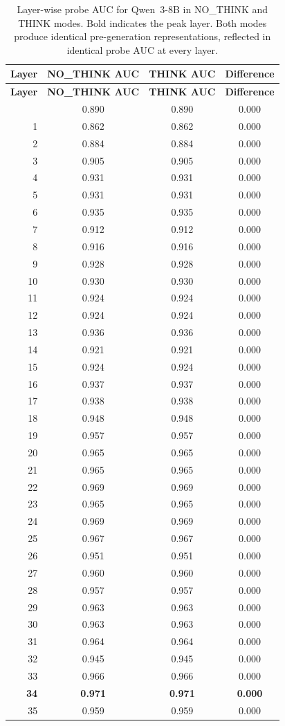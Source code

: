 \documentclass[accepted]{article}
\begin{document}
\begin{longtable}{rccc}
\caption{Layer-wise probe AUC for Qwen~3-8B in NO\_THINK and THINK
  modes.  Bold indicates the peak layer.  Both modes produce identical
  pre-generation representations, reflected in identical probe AUC at
  every layer.}
\label{tab:qwen_probe_layers} \\
\toprule
\textbf{Layer} & \textbf{NO\_THINK AUC} & \textbf{THINK AUC} & \textbf{Difference} \\
\midrule
\endfirsthead
\toprule
\textbf{Layer} & \textbf{NO\_THINK AUC} & \textbf{THINK AUC} & \textbf{Difference} \\
\midrule
\endhead
\bottomrule
\endfoot
 0 & 0.890 & 0.890 & 0.000 \\
 1 & 0.862 & 0.862 & 0.000 \\
 2 & 0.884 & 0.884 & 0.000 \\
 3 & 0.905 & 0.905 & 0.000 \\
 4 & 0.931 & 0.931 & 0.000 \\
 5 & 0.931 & 0.931 & 0.000 \\
 6 & 0.935 & 0.935 & 0.000 \\
 7 & 0.912 & 0.912 & 0.000 \\
 8 & 0.916 & 0.916 & 0.000 \\
 9 & 0.928 & 0.928 & 0.000 \\
10 & 0.930 & 0.930 & 0.000 \\
11 & 0.924 & 0.924 & 0.000 \\
12 & 0.924 & 0.924 & 0.000 \\
13 & 0.936 & 0.936 & 0.000 \\
14 & 0.921 & 0.921 & 0.000 \\
15 & 0.924 & 0.924 & 0.000 \\
16 & 0.937 & 0.937 & 0.000 \\
17 & 0.938 & 0.938 & 0.000 \\
18 & 0.948 & 0.948 & 0.000 \\
19 & 0.957 & 0.957 & 0.000 \\
20 & 0.965 & 0.965 & 0.000 \\
21 & 0.965 & 0.965 & 0.000 \\
22 & 0.969 & 0.969 & 0.000 \\
23 & 0.965 & 0.965 & 0.000 \\
24 & 0.969 & 0.969 & 0.000 \\
25 & 0.967 & 0.967 & 0.000 \\
26 & 0.951 & 0.951 & 0.000 \\
27 & 0.960 & 0.960 & 0.000 \\
28 & 0.957 & 0.957 & 0.000 \\
29 & 0.963 & 0.963 & 0.000 \\
30 & 0.963 & 0.963 & 0.000 \\
31 & 0.964 & 0.964 & 0.000 \\
32 & 0.945 & 0.945 & 0.000 \\
33 & 0.966 & 0.966 & 0.000 \\
\textbf{34} & \textbf{0.971} & \textbf{0.971} & \textbf{0.000} \\
35 & 0.959 & 0.959 & 0.000 \\
\end{longtable}
\end{document}
